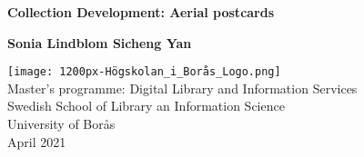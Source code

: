 \begin{titlepage}
	\begin{center}
		\vspace*{1cm}
		
		{\Large \textbf{Collection Development: Aerial postcards}}
		
		\vspace{0.5cm}
	
		
		\vspace{1.5cm}
		
		\textbf{Sonia Lindblom \quad \quad Sicheng Yan}
		
		\vfill
		
		
		
		\vspace{0.8cm}
		
		\texttt{[image: 1200px-Högskolan\_i\_Borås\_Logo.png]}\\
		\vspace{0.4cm}
		Master's programme: Digital Library and Information Services\\
		Swedish School of Library an Information Science \\
		University of Borås\\
		April 2021
	
		
	\end{center}
\end{titlepage}